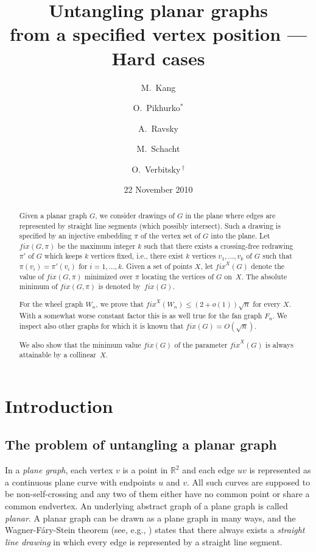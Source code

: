 \documentclass[reqno,12pt]{amsart}
\title{Untangling planar graphs\\ from a specified vertex position
--- Hard cases}
\author{M.~Kang}
\author{O.~Pikhurko$^*$}
\author{A.~Ravsky}
\author{M.~Schacht}
\author{O.~Verbitsky\,$^\dag$}
\date{22 November 2010}
\newcommand{\fix}[1]{\mathit{fix}(#1)}
\newcommand{\reals}{\mathbb{R}}
\newcommand{\fixx}[1]{\mathit{fix}^X(#1)}
\begin{document}
 

\begin{abstract}
Given a planar graph $G$,
we consider drawings of $G$ in the plane where edges are represented
by straight line segments (which possibly intersect).
Such a drawing is specified by an injective embedding $\pi$
of the vertex set of $G$ into the plane.
Let $\fix{G,\pi}$ be the maximum integer $k$  such that there exists
a crossing-free redrawing $\pi'$ of $G$ which keeps $k$ vertices
fixed, i.e., there exist $k$ vertices $v_1,\dots,v_k$ of $G$ such that 
$\pi(v_i)=\pi'(v_i)$ for $i=1,\dots,k$. Given a set of points $X$, let
$\fixx G$ denote the value of $\fix{G,\pi}$ minimized over $\pi$
locating the vertices of $G$ on~$X$.
The absolute minimum of $\fix{G,\pi}$ is denoted by~$\fix G$.

For the wheel graph $W_n$, we prove that $\fixx{W_n}\le(2+o(1))\sqrt n$
for every $X$. With a somewhat worse constant factor this is as well true
for the fan graph $F_n$. 
We inspect also other graphs for which it is known that $\fix{G}=O(\sqrt n)$.

We also show that the minimum value $\fix G$ of the parameter
$\fixx G$ is always attainable by a collinear~$X$.
\end{abstract}

\maketitle


\section{Introduction}\label{s:intro}
\subsection{The problem of untangling a planar graph}
In a \emph{plane graph}, each vertex $v$ 
is a point in  $\reals^{2}$ and each edge $uv$ 
is represented as a continuous plane curve with endpoints $u$ and $v$.
All such curves are supposed to be non-self-crossing and any two of them
either have no common point or share a common endvertex.
An underlying abstract graph of a plane graph is called \emph{planar}.
A planar graph can be drawn as a plane graph in many ways, and
the Wagner-F\'ary-Stein theorem (see, e.g., \cite{NRa})
states that there always exists a \emph{straight line drawing}
in which every edge is represented by a straight line segment.
\end{document}
